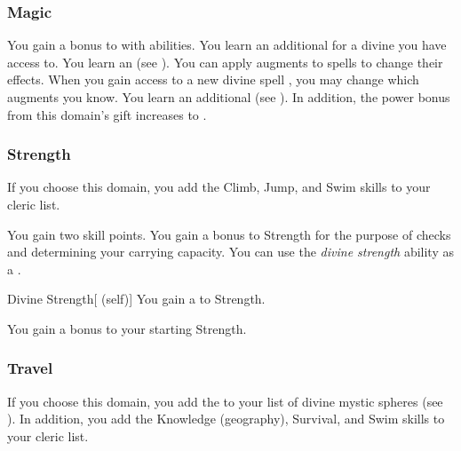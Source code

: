         \subsubsection{Magic}
             You gain a  bonus to  with  abilities.
             You learn an additional  for a divine  you have access to.
             You learn an  (see ).
            You can apply augments to spells to change their effects.
            When you gain access to a new divine spell , you may change which augments you know.
             You learn an additional  (see ).
            In addition, the power bonus from this domain's gift increases to .

        \subsubsection{Strength}
            If you choose this domain, you add the Climb, Jump, and Swim skills to your cleric  list.

             You gain two skill points.
             You gain a  bonus to Strength for the purpose of checks and determining your carrying capacity.
             You can use the \textit{divine strength} ability as a .
            \begin{attuneability}{Divine Strength}[ (self)]
                You gain a   to Strength.
            \end{attuneability}
             You gain a  bonus to your starting Strength.

        \subsubsection{Travel}
            If you choose this domain, you add the   to your list of divine mystic spheres (see ).
            In addition, you add the Knowledge (geography), Survival, and Swim skills to your cleric  list.

